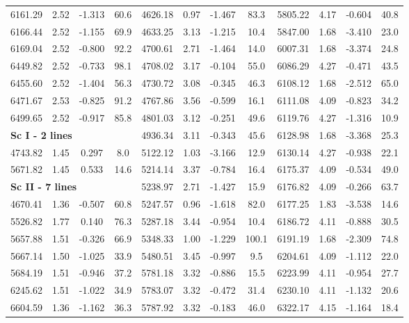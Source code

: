\documentclass[dvips,12pt,a4paper]{report}
\begin{document}
{{\begin{table}[h]
\begin{tabular}{c c c c | c c c c | c c c c}
6161.29 & 2.52 & -1.313 &  60.6 & 4626.18 & 0.97 & -1.467 &  83.3 & 5805.22 & 4.17 & -0.604 &  40.8 \\
6166.44 & 2.52 & -1.155 &  69.9 & 4633.25 & 3.13 & -1.215 &  10.4 & 5847.00 & 1.68 & -3.410 &  23.0 \\
6169.04 & 2.52 & -0.800 &  92.2 & 4700.61 & 2.71 & -1.464 &  14.0 & 6007.31 & 1.68 & -3.374 &  24.8 \\
6449.82 & 2.52 & -0.733 &  98.1 & 4708.02 & 3.17 & -0.104 &  55.0 & 6086.29 & 4.27 & -0.471 &  43.5 \\
6455.60 & 2.52 & -1.404 &  56.3 & 4730.72 & 3.08 & -0.345 &  46.3 & 6108.12 & 1.68 & -2.512 &  65.0 \\
6471.67 & 2.53 & -0.825 &  91.2 & 4767.86 & 3.56 & -0.599 &  16.1 & 6111.08 & 4.09 & -0.823 &  34.2 \\
6499.65 & 2.52 & -0.917 &  85.8 & 4801.03 & 3.12 & -0.251 &  49.6 & 6119.76 & 4.27 & -1.316 &  10.9 \\
\multicolumn{3}{l}{\textbf{Sc I - 2 lines}} &  & 4936.34 & 3.11 & -0.343 &  45.6 & 6128.98 & 1.68 & -3.368 &  25.3 \\
4743.82 & 1.45 &  0.297 &   8.0 & 5122.12 & 1.03 & -3.166 &  12.9 & 6130.14 & 4.27 & -0.938 &  22.1 \\
5671.82 & 1.45 &  0.533 &  14.6 & 5214.14 & 3.37 & -0.784 &  16.4 & 6175.37 & 4.09 & -0.534 &  49.0 \\
\multicolumn{3}{l}{\textbf{Sc II - 7 lines}} & & 5238.97 & 2.71 & -1.427 &  15.9 & 6176.82 & 4.09 & -0.266 &  63.7 \\
4670.41 & 1.36 & -0.507 &  60.8 & 5247.57 & 0.96 & -1.618 &  82.0 & 6177.25 & 1.83 & -3.538 &  14.6 \\
5526.82 & 1.77 &  0.140 &  76.3 & 5287.18 & 3.44 & -0.954 &  10.4 & 6186.72 & 4.11 & -0.888 &  30.5 \\
5657.88 & 1.51 & -0.326 &  66.9 & 5348.33 & 1.00 & -1.229 & 100.1 & 6191.19 & 1.68 & -2.309 &  74.8 \\
5667.14 & 1.50 & -1.025 &  33.9 & 5480.51 & 3.45 & -0.997 &   9.5 & 6204.61 & 4.09 & -1.112 &  22.0 \\
5684.19 & 1.51 & -0.946 &  37.2 & 5781.18 & 3.32 & -0.886 &  15.5 & 6223.99 & 4.11 & -0.954 &  27.7 \\
6245.62 & 1.51 & -1.022 &  34.9 & 5783.07 & 3.32 & -0.472 &  31.4 & 6230.10 & 4.11 & -1.132 &  20.6 \\
6604.59 & 1.36 & -1.162 &  36.3 & 5787.92 & 3.32 & -0.183 &  46.0 & 6322.17 & 4.15 & -1.164 &  18.4 \\

\end{tabular}
\end{table}}}
\end{document}
